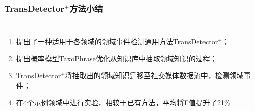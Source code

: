 \begin{frame}
\frametitle{TransDetector$^+$方法小结}

\begin{columns}

\begin{enumerate}
	\item 提出了一种适用于各领域的领域事件检测通用方法TransDetector$^+$；
	\item 提出概率模型TaxoPhrase优化从知识库中抽取领域知识的过程；
	\item TransDetector$^+$将抽取出的领域知识迁移至社交媒体数据流中，检测领域事件；
	\item 在4个示例领域中进行实验，相较于已有方法，平均将F值提升了21\%
\end{enumerate}


\end{columns}


\end{frame}

